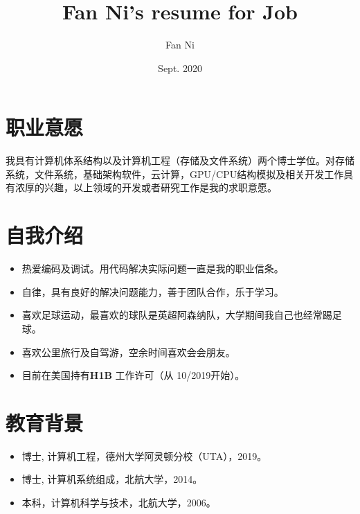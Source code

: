 \documentclass{article}
\title{Fan Ni's resume for Job}
\author{Fan Ni}
\date{Sept. 2020}
\begin{document}

\makecvtitle %

\section{职业意愿}
我具有计算机体系结构以及计算机工程（存储及文件系统）两个博士学位。对存储系统，文件系统，基础架构软件，云计算，GPU/CPU结构模拟及相关开发工作具有浓厚的兴趣，以上领域的开发或者研究工作是我的求职意愿。
\section{自我介绍}
\begin{itemize}
    \item 热爱编码及调试。用代码解决实际问题一直是我的职业信条。
    \item 自律，具有良好的解决问题能力，善于团队合作，乐于学习。
    \item 喜欢足球运动，最喜欢的球队是英超阿森纳队，大学期间我自己也经常踢足球。
    \item 喜欢公里旅行及自驾游，空余时间喜欢会会朋友。
    \item 目前在美国持有\textbf{H1B} 工作许可（从 10/2019开始）。
\end{itemize}

\section{教育背景}
\begin{itemize}
\item 博士, 计算机工程，德州大学阿灵顿分校（UTA），2019。
\item 博士, 计算机系统组成，北航大学，2014。
\item 本科，计算机科学与技术，北航大学，2006。
\end{itemize}
\end{document}
